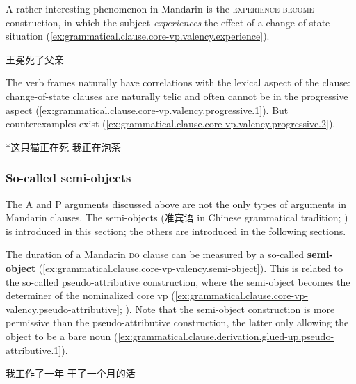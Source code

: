 \documentclass[UTF8, a4paper, oneside, scheme=plain, 12pt]{ctexrep}
\newcommand*{\citepage}[1]{p.~{#1}}
\newcommand*{\concept}[1]{\textbf{#1}}
\newcommand*{\category}[1]{\textsc{#1}}
\begin{document}
A rather interesting phenomenon in Mandarin is the \category{experience}-\category{become} construction,
in which the subject \emph{experiences} the effect of a change-of-state situation
(\ref{ex:grammatical.clause.core-vp.valency.experience}).

\begin{exe}
    \ex\label{ex:grammatical.clause.core-vp.valency.experience}
    \begin{xlist}
        \ex 王冕死了父亲
    \end{xlist}
\end{exe}

The verb frames naturally have correlations with the lexical aspect of the clause:
change-of-state clauses are naturally telic and often cannot be in the progressive aspect
(\ref{ex:grammatical.clause.core-vp.valency.progressive.1}).
But counterexamples exist
(\ref{ex:grammatical.clause.core-vp.valency.progressive.2}).

\begin{exe}
    \ex\label{ex:grammatical.clause.core-vp.valency.progressive.1} *这只猫正在死
    \ex\label{ex:grammatical.clause.core-vp.valency.progressive.2} 我正在泡茶
\end{exe}

\subsubsection{So-called semi-objects}

The A and P arguments discussed above are not the only types of arguments in Mandarin clauses.
The semi-objects (准宾语 in Chinese grammatical tradition; \citealt[\citepage{132}]{zhudexigrammar}) is introduced in this section;
the others are introduced in the following sections.

The duration of a Mandarin \category{do} clause
can be measured by a so-called \concept{semi-object}
(\ref{ex:grammatical.clause.core-vp-valency.semi-object}).
This is related to the so-called pseudo-attributive construction,
where the semi-object becomes the determiner of the nominalized core \ac{vp}
(\ref{ex:grammatical.clause.core-vp-valency.pseudo-attributive};
).
Note that the semi-object construction is more permissive 
than the pseudo-attributive construction,
the latter only allowing the object to be a bare noun
(\ref{ex:grammatical.clause.derivation.glued-up.pseudo-attributive.1}).

\begin{exe}
    \ex\label{ex:grammatical.clause.core-vp-valency.semi-object} 我工作了一年
    \ex\label{ex:grammatical.clause.core-vp-valency.pseudo-attributive} 干了一个月的活
\end{exe}
\end{document}
